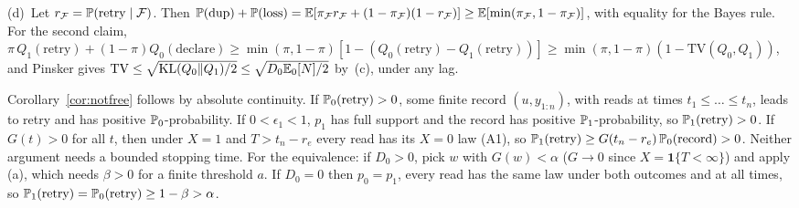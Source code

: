 (d)~Let $r_{\mathcal F}=\mathbb{P}(\text{retry}\mid\mathcal F)$. Then $\mathbb{P}(\mathrm{dup})+\mathbb{P}(\mathrm{loss})=\mathbb{E}[\pi_{\mathcal F}r_{\mathcal F}+(1-\pi_{\mathcal F})(1-r_{\mathcal F})]\ge\mathbb{E}[\min(\pi_{\mathcal F},1-\pi_{\mathcal F})]$,
with equality for the Bayes rule. For the second claim, $\pi\,Q_1(\text{retry})+(1-\pi)Q_0(\text{declare})\ge\min(\pi,1-\pi)[1-(Q_0(\text{retry})-Q_1(\text{retry}))]\ge\min(\pi,1-\pi)(1-\mathrm{TV}(Q_0,Q_1))$,
and Pinsker gives $\mathrm{TV}\le\sqrt{\mathrm{KL}(Q_0\|Q_1)/2}\le\sqrt{D_0\mathbb{E}_0[N]/2}$ by~(c), under any lag.

Corollary~\ref{cor:notfree} follows by absolute continuity. If $\mathbb{P}_0(\text{retry})>0$, some finite record $(u,y_{1:n})$, with reads at times $t_1\le\dots\le t_n$, leads to retry and has
positive $\mathbb{P}_0$-probability. If $0<\epsilon_1<1$, $p_1$ has full support and the record has positive $\mathbb{P}_1$-probability, so $\mathbb{P}_1(\text{retry})>0$. If $G(t)>0$ for all $t$, then under
$X{=}1$ and $T>t_n-r_e$ every read has its $X{=}0$ law (A1), so $\mathbb{P}_1(\text{retry})\ge G(t_n-r_e)\,\mathbb{P}_0(\text{record})>0$. Neither argument needs a bounded stopping time.
For the equivalence: if $D_0>0$, pick $w$ with $G(w)<\alpha$ ($G\to0$ since $X=\mathbf 1\{T<\infty\}$) and apply (a), which needs $\beta>0$ for a finite threshold $a$. If $D_0=0$ then $p_0=p_1$,
every read has the same law under both outcomes and at all times, so $\mathbb{P}_1(\text{retry})=\mathbb{P}_0(\text{retry})\ge1-\beta>\alpha$.

